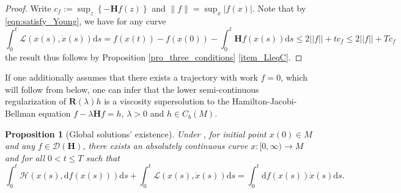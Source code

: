 \documentclass[a4paper]{article}
\newcommand{\cL}{\mathcal{L}}
\newcommand{\dd}{ \mathrm{d}}
\newcommand{\vn}[1]{\left|  \left| #1\right|  \right|}
\numberwithin{equation}{section}
\newtheorem{proposition}[theorem]{Proposition}
\theoremstyle{definition}
\begin{document}
\begin{proof}
    Write $c_f := \sup_{z} \left\{ -\mathbf{H}f(z) \right\}$ and $\|f\|=\sup_x|f(x)|$. Note that by \eqref{eqn:satisfy_Young}, we have for any curve
\begin{equation*}
    \int_0^t \cL(x(s),\dot{x}(s)) \dd s = f(x(t)) - f(x(0)) - \int_0^t \mathbf{H}f(x(s)) \dd s  \leq 2 \vn{f} + tc_f \leq 2 \vn{f} + T c_f
\end{equation*}
the result thus follows by Proposition \ref{pro_three_conditions} \ref{item_LleqC}.
\end{proof}
If one additionally assumes that there exists a trajectory with work $f=0$, which will follow from  below, one can infer that the lower semi-continuous regularization of $\mathbf{R}(\lambda)h$ is a viscosity supersolution to the Hamilton-Jacobi-Bellman equation $f-\lambda \mathbf{H}f=h$, $\lambda> 0$ and $h \in C_b(M)$.
\begin{proposition}[Global solutions' existence]\label{pro_pro_three_conditions_super}
Under ,
for initial point $x(0)\in M$ and any $f\in \mathcal{D}(\mathbf{H})$, there exists an absolutely continuous curve $x:[0,\infty)\to M$ and for all $0<t\leq T$ such that
	\begin{equation}\label{eqn_global_local}
		\int^t_0\mathcal{H}(x(s),\mathrm{d} f(x(s)))\mathrm{d}s+\int^t_0\mathcal{L}(x(s),\dot{x}(s))\mathrm{d}s=\int^t_0\mathrm{d}f(x(s))\dot{x}(s)\mathrm{d}s.
	\end{equation}
\end{proposition}
\end{document}
